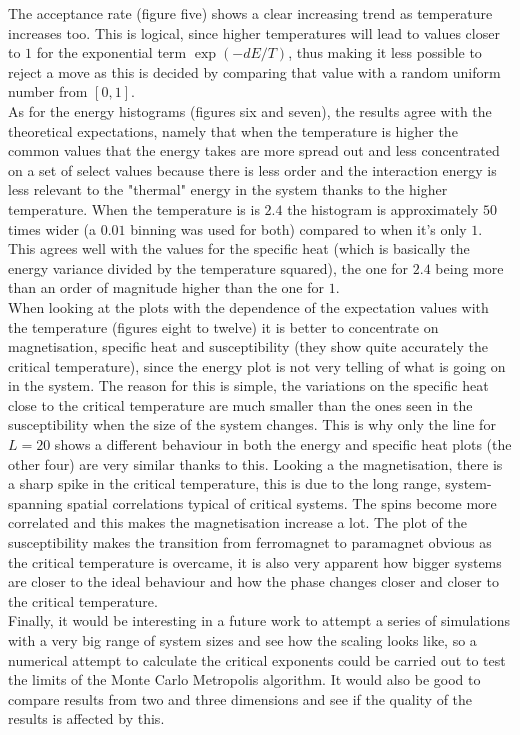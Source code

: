 \documentclass[11pt,a4paper,oneside]{article}
\begin{document}
		The acceptance rate (figure five) shows a clear increasing trend as temperature increases too. This is logical, since higher temperatures will lead to values closer to $1$ for the exponential term $\exp{\left(-dE/T\right)}$, thus making it less possible to reject a move as this is decided by comparing that value with a random uniform number from $\left[0,1\right]$.\\
		
		As for the energy histograms (figures six and seven), the results agree with the theoretical expectations, namely that when the temperature is higher the common values that the energy takes are more spread out and less concentrated on a set of select values because there is less order and the interaction energy is less relevant to the "thermal" energy in the system thanks to the higher temperature. When the temperature is is $2.4$ the histogram is approximately $50$ times wider (a $0.01$ binning was used for both) compared to when it's only $1$. This agrees well with the values for the specific heat (which is basically the energy variance divided by the temperature squared), the one for $2.4$ being more than an order of magnitude higher than the one for $1$.\\
		
		When looking at the plots with the dependence of the expectation values with the temperature (figures eight to twelve) it is better to concentrate on magnetisation, specific heat and susceptibility (they show quite accurately the critical temperature), since the energy plot is not very telling of what is going on in the system. The reason for this is simple, the variations on the specific heat close to the critical temperature are much smaller than the ones seen in the susceptibility when the size of the system changes. This is why only the line for $L=20$ shows a different behaviour in both the energy and specific heat plots (the other four) are very similar thanks to this. Looking a the magnetisation, there is a sharp spike in the critical temperature, this is due to the long range, system-spanning spatial correlations typical of critical systems. The spins become more correlated and this makes the magnetisation increase a lot. The plot of the susceptibility makes the transition from ferromagnet to paramagnet obvious as the critical temperature is overcame, it is also very apparent how bigger systems are closer to the ideal behaviour and how the phase changes closer and closer to the critical temperature.\\
		
		Finally, it would be interesting in a future work to attempt a series of simulations with a very big range of system sizes and see how the scaling looks like, so a numerical attempt to calculate the critical exponents could be carried out to test the limits of the Monte Carlo Metropolis algorithm. It would also be good to compare results from two and three dimensions and see if the quality of the results is affected by this.\\
		
\end{document}

